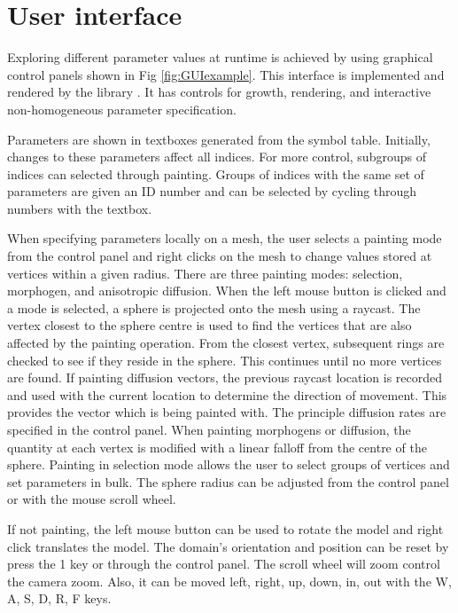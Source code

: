 \section{User interface}
Exploring different parameter values at runtime is achieved by using graphical control panels shown in Fig \ref{fig:GUIexample}. This interface is implemented and rendered by the library  \citep{Cornut2019}. It has controls for growth, rendering, and interactive non-homogeneous parameter specification. 

Parameters are shown in textboxes generated from the symbol table. Initially, changes to these parameters affect all indices. For more control, subgroups of indices can selected through painting. Groups of indices with the same set of parameters are given an ID number and can be selected by cycling through numbers with the  textbox. 

When specifying parameters locally on a mesh, the user selects a painting mode from the control panel and right clicks on the mesh to change values stored at vertices within a given radius. There are three painting modes: selection, morphogen, and anisotropic diffusion. When the left mouse button is clicked and a mode is selected, a sphere is projected onto the mesh using a raycast. The vertex closest to the sphere centre is used to find the vertices that are also affected by the painting operation. From the closest vertex, subsequent rings are checked to see if they reside in the sphere. This continues until no more vertices are found. If painting diffusion vectors, the previous raycast location is recorded and used with the current location to determine the direction of movement. This provides the vector which is being painted with.  The principle diffusion rates are specified in the control panel. When painting morphogens or diffusion, the quantity at each vertex is modified with a linear falloff from the centre of the sphere. Painting in selection mode allows the user to select groups of vertices and set parameters in bulk. The sphere radius can be adjusted from the control panel or with the mouse scroll wheel.

If not painting, the left mouse button can be used to rotate the model and right click translates the model. The domain's orientation and position can be reset by press the 1 key or through the control panel. The scroll wheel will zoom control the camera zoom. Also, it can be moved left, right, up, down, in, out with the W, A, S, D, R, F keys.

